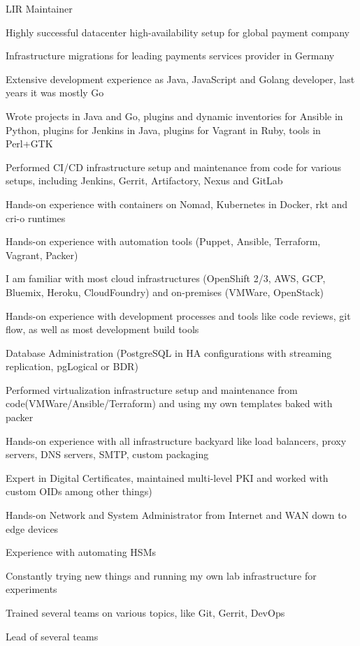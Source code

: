 \documentclass[letterpaper,11pt]{article}
\begin{document}
	LIR Maintainer
	
	Highly successful datacenter high-availability setup for global payment company
	
	Infrastructure migrations for leading payments services provider in Germany
	
	Extensive development experience as Java, JavaScript and Golang developer, last years it was mostly Go
		
	Wrote projects in Java and Go, plugins and dynamic inventories for Ansible in Python, plugins for Jenkins in Java, plugins for Vagrant in Ruby, tools in Perl+GTK
	
	Performed CI/CD infrastructure setup and maintenance from code for various setups, including Jenkins, Gerrit, Artifactory, Nexus and GitLab
	
	Hands-on experience with containers on Nomad, Kubernetes in Docker, rkt and cri-o runtimes
	
	Hands-on experience with automation tools (Puppet, Ansible, Terraform, Vagrant, Packer)
	
	I am familiar with most cloud infrastructures (OpenShift 2/3, AWS, GCP, Bluemix, Heroku, CloudFoundry) and on-premises (VMWare, OpenStack)
	
	Hands-on experience with development processes and tools like code reviews, git flow, as well as most development build tools
	
	Database Administration (PostgreSQL in HA configurations with streaming replication, pgLogical or BDR)
	
	Performed virtualization infrastructure setup and maintenance from code(VMWare/Ansible/Terraform) and using my own templates baked with packer
		
	Hands-on experience with all infrastructure backyard like load balancers, proxy servers, DNS servers, SMTP, custom packaging
	
	Expert in Digital Certificates, maintained multi-level PKI and worked with custom OIDs among other things)
	
	Hands-on Network and System Administrator from Internet and WAN down to edge devices
	
	Experience with automating HSMs

	Constantly trying new things and running my own lab infrastructure for experiments
	
	Trained several teams on various topics, like Git, Gerrit, DevOps
	
	Lead of several teams
	
\end{document}
